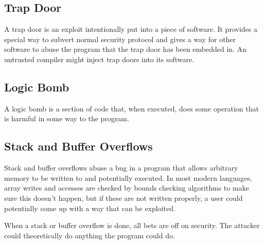 \documentclass{article}
\begin{document}
\subsection{Trap Door}

A trap door is an exploit intentionally put into a piece of software. It
provides a special way to subvert normal security protocol and gives a way for
other software to abuse the program that the trap door has been embedded in.
An untrusted compiler might inject trap doors into its software.

\subsection{Logic Bomb}
A logic bomb is a section of code that, when executed, does some operation that
is harmful in some way to the program.

\subsection{Stack and Buffer Overflows}

Stack and buffer overflows abuse a bug in a program that allows arbitrary
memory to be written to and potentially executed. In most modern languages,
array writes and accesses are checked by bounds checking algorithms to make
sure this doesn't happen, but if these are not written properly, a user could
potentially come up with a way that can be exploited.

When a stack or buffer overflow is done, all bets are off on security. The
attacker could theoretically do anything the program could do.
\end{document}
